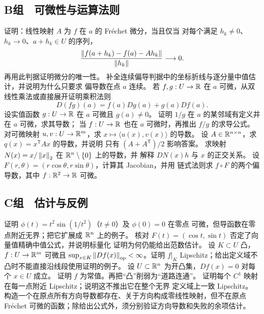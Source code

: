 \subsection*{B组　可微性与运算法则}
\begin{enumerate}[label=\textbf{\thechapter.\arabic*.},resume]
 证明：线性映射 \(A\) 为 \(f\) 在 \(a\) 的 Fréchet 微分，当且仅当
 对每个满足 \(h_k\ne0\)、\(h_k\to0\)、\(a+h_k\in U\) 的序列，
 \[
 \frac{\left\lVert f(a+h_k)-f(a)-Ah_k\right\rVert}{\left\lVert h_k\right\rVert}\longrightarrow0.
 \]
 再用此判据证明微分的唯一性。
 补全连续偏导判据中的坐标折线与逐分量中值估计，并说明为什么只要求
 偏导数在点 $a$ 连续。
 若 $f,g:U\to\mathbb{R}$ 在 $a$ 可微，从双线性乘法或直接展开证明乘积法则
 \[
 D(fg)(a)=f(a)Dg(a)+g(a)Df(a).
 \]
 设实值函数 \(g:U\to\mathbb{R}\) 在 \(a\) 可微且 \(g(a)\ne0\)。
 证明 \(1/g\) 在 \(a\) 的某邻域有定义并在 \(a\) 可微，求其导数；
 当 \(f:U\to\mathbb{R}\) 也在 \(a\) 可微时，再推出 \(f/g\) 的求导公式。
 对可微映射 \(u,v:U\to\mathbb{R}^m\)，求
 \(x\mapsto\langle u(x),v(x)\rangle\) 的导数。
 设 \(A\in\mathbb{R}^{n\times n}\)，求 \(q(x)=x^{\mathsf T}Ax\) 的导数，并说明
 只有 \((A+A^{\mathsf T})/2\) 影响答案。
 求映射 \(N(x)=x/\left\lVert x\right\rVert_2\) 在 \(\mathbb{R}^n\setminus\{0\}\) 上的导数，并
 解释 \(DN(x)h\) 与 \(x\) 的正交关系。
 设 \(F(r,\theta)=(r\cos\theta,r\sin\theta)\)，计算其 Jacobian，并用
 链式法则求 \(f\circ F\) 的两个偏导数，其中 \(f:\mathbb{R}^2\to\mathbb{R}\) 可微。
\end{enumerate}

\subsection*{C组　估计与反例}
\begin{enumerate}[label=\textbf{\thechapter.\arabic*.},resume]
 证明 \(\phi(t)=t^2\sin(1/t^2)\)（\(t\ne0\)）及 \(\phi(0)=0\) 在零点
 可微，但导函数在零点附近无界；把它扩展成 \(\mathbb{R}^n\) 上的例子。
 核对 \(F(t)=(\cos t,\sin t)\) 否定了向量值精确中值公式，并说明标量化
 证明为何仍能给出范数估计。
 设 \(K\subset U\) 凸，\(f:U\to\mathbb{R}^m\) 可微且
 \(\sup_{x\in K}\left\lVert Df(x)\right\rVert_{\mathrm{op}}<\infty\)。证明 \(f|_K\)
 Lipschitz；给出定义域不凸时不能直接沿线段使用证明的例子。
 设 \(U\subset\mathbb{R}^n\) 为开凸集，\(Df(x)=0\) 对每个 \(x\in U\) 成立。
 证明 \(f\) 为常值。再把“凸”削弱为“道路连通”。
 证明每个 \(C^1\) 映射在每一点附近 Lipschitz；说明这不推出它在整个无界
 定义域上一致 Lipschitz。
 构造一个在原点所有方向导数都存在、关于方向构成零线性映射，但不在原点
 Fréchet 可微的函数；除给出公式外，须分别验证方向导数和失败的余项估计。
\end{enumerate}
